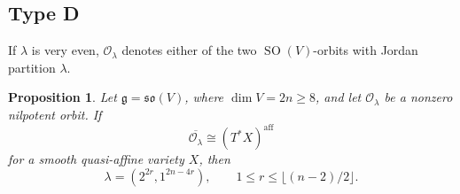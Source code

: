 \documentclass[12pt]{article}
\newtheorem{proposition}[theorem]{Proposition}
\theoremstyle{remark}
\theoremstyle{plain}
\newcommand{\aff}{\mathrm{aff}}
\begin{document}
\subsection{Type D}
\label{sec:typeD}

If $\lambda$ is very even, $\mathcal O_\lambda$ denotes
either of the two $\operatorname{SO}(V)$-orbits with Jordan partition
$\lambda$.

\begin{proposition}\label{prop:typeD}
Let $\mathfrak g=\mathfrak{so}(V)$, where $\dim V=2n\geq8$, and let
$\mathcal O_\lambda$ be a nonzero nilpotent orbit. If
\[
\overline{\mathcal O_\lambda}\cong(T^*X)^{\aff}
\]
for a smooth quasi-affine variety $X$, then
\[
\lambda=(2^{2r},1^{2n-4r}),
\qquad
1\leq r\leq\lfloor(n-2)/2\rfloor.
\]
\end{proposition}
\end{document}
